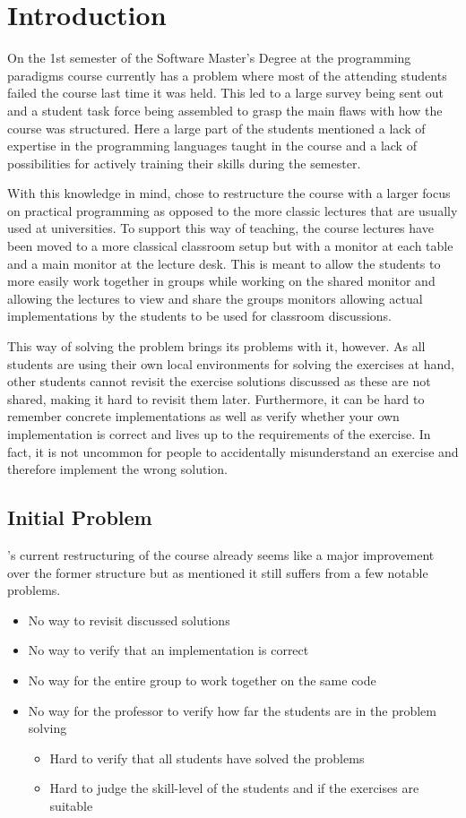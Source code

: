 \chapter{Introduction} \label{chap:introduction}
On the 1st semester of the Software Master’s Degree at \aau{} the programming paradigms course currently has a problem where most of the attending students failed the course last time it was held. This led to a large survey being sent out and a student task force being assembled to grasp the main flaws with how the course was structured. Here a large part of the students mentioned a lack of expertise in the programming languages taught in the course and a lack of possibilities for actively training their skills during the semester. 


With this knowledge in mind, \aau{} chose to restructure the course with a larger focus on practical programming as opposed to the more classic lectures that are usually used at universities. To support this way of teaching, the course lectures have been moved to a more classical classroom setup but with a monitor at each table and a main monitor at the lecture desk. This is meant to allow the students to more easily work together in groups while working on the shared monitor and allowing the lectures to view and share the groups monitors allowing actual implementations by the students to be used for classroom discussions. 


This way of solving the problem brings its problems with it, however. As all students are using their own local environments for solving the exercises at hand, other students cannot revisit the exercise solutions discussed as these are not shared, making it hard to revisit them later. Furthermore, it can be hard to remember concrete implementations as well as verify whether your own implementation is correct and lives up to the requirements of the exercise. In fact, it is not uncommon for people to accidentally misunderstand an exercise and therefore implement the wrong solution.  

\section{Initial Problem} 
\aau's current restructuring of the course already seems like a major improvement over the former structure but as mentioned it still suffers from a few notable problems.
\begin{itemize}
	\item No way to revisit discussed solutions
	\item No way to verify that an implementation is correct
	\item No way for the entire group to work together on the same code
	\item No way for the professor to verify how far the students are in the problem solving
	\begin{itemize}
		\item Hard to verify that all students have solved the problems
		\item Hard to judge the skill-level of the students and if the exercises are suitable
	\end{itemize}
\end{itemize}

